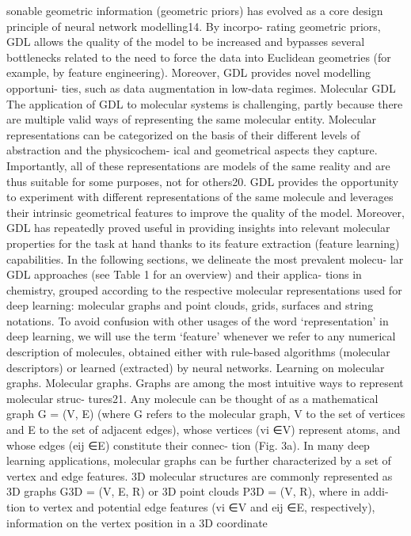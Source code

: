 sonable geometric information (geometric priors) has evolved as a
core design principle of neural network modelling14. By incorpo-
rating geometric priors, GDL allows the quality of the model to be
increased and bypasses several bottlenecks related to the need to
force the data into Euclidean geometries (for example, by feature
engineering). Moreover, GDL provides novel modelling opportuni-
ties, such as data augmentation in low-data regimes.
Molecular GDL
The application of GDL to molecular systems is challenging, partly
because there are multiple valid ways of representing the same
molecular entity. Molecular representations can be categorized on
the basis of their different levels of abstraction and the physicochem-
ical and geometrical aspects they capture. Importantly, all of these
representations are models of the same reality and are thus suitable
for some purposes, not for others20. GDL provides the opportunity
to experiment with different representations of the same molecule
and leverages their intrinsic geometrical features to improve the
quality of the model. Moreover, GDL has repeatedly proved useful in
providing insights into relevant molecular properties for the task at
hand thanks to its feature extraction (feature learning) capabilities.
In the following sections, we delineate the most prevalent molecu-
lar GDL approaches (see Table 1 for an overview) and their applica-
tions in chemistry, grouped according to the respective molecular
representations used for deep learning: molecular graphs and point
clouds, grids, surfaces and string notations. To avoid confusion with
other usages of the word ‘representation’ in deep learning, we will use
the term ‘feature’ whenever we refer to any numerical description of
molecules, obtained either with rule-based algorithms (molecular
descriptors) or learned (extracted) by neural networks.
Learning on molecular graphs. Molecular graphs. Graphs are
among the most intuitive ways to represent molecular struc-
tures21. Any molecule can be thought of as a mathematical graph
G = (V, E) (where G refers to the molecular graph, V to the set of
vertices and E to the set of adjacent edges), whose vertices (vi ∈V)
represent atoms, and whose edges (eij ∈E) constitute their connec-
tion (Fig. 3a). In many deep learning applications, molecular graphs
can be further characterized by a set of vertex and edge features.
3D molecular structures are commonly represented as 3D graphs
G3D = (V, E, R) or 3D point clouds P3D = (V, R), where in addi-
tion to vertex and potential edge features (vi ∈V and eij ∈E,
respectively), information on the vertex position in a 3D coordinate
